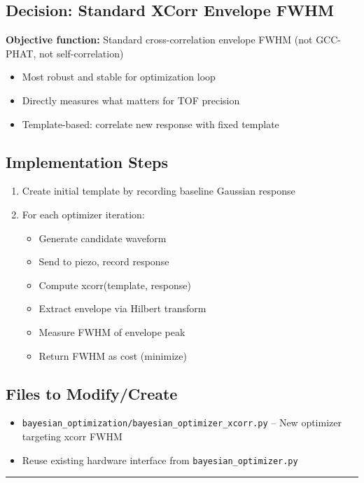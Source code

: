 \documentclass[11pt]{article}
\begin{document}
\subsection{Decision: Standard XCorr Envelope FWHM}
\textbf{Objective function:} Standard cross-correlation envelope FWHM (not GCC-PHAT, not self-correlation)
\begin{itemize}
    \item Most robust and stable for optimization loop
    \item Directly measures what matters for TOF precision
    \item Template-based: correlate new response with fixed template
\end{itemize}

\subsection{Implementation Steps}
\begin{enumerate}
    \item Create initial template by recording baseline Gaussian response
    \item For each optimizer iteration:
    \begin{itemize}
        \item Generate candidate waveform
        \item Send to piezo, record response
        \item Compute xcorr(template, response)
        \item Extract envelope via Hilbert transform
        \item Measure FWHM of envelope peak
        \item Return FWHM as cost (minimize)
    \end{itemize}
\end{enumerate}

\subsection{Files to Modify/Create}
\begin{itemize}
    \item \texttt{bayesian\_optimization/bayesian\_optimizer\_xcorr.py} -- New optimizer targeting xcorr FWHM
    \item Reuse existing hardware interface from \texttt{bayesian\_optimizer.py}
\end{itemize}

\hrule
\vspace{1em}
\end{document}
